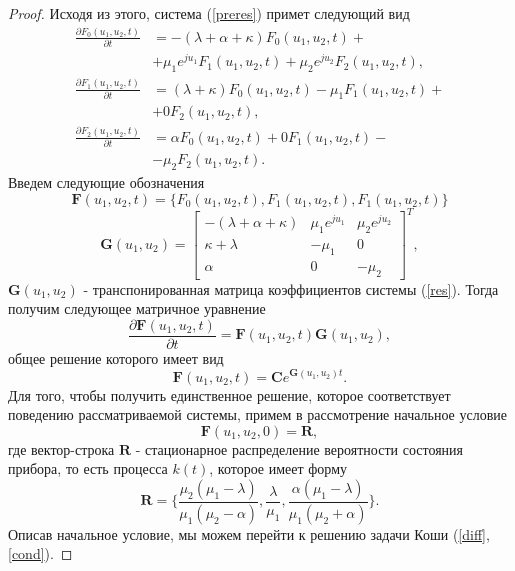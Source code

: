 \begin{proof}
Исходя из этого, система (\ref{preres}) примет следующий вид
\begin{equation} \label{res}
	\begin{split}
		\frac{{\partial F_{0}(u_{1},u_{2},t)}}{{\partial t}} &= -(\lambda + \alpha+ \kappa)F_{0}(u_{1},u_{2},t) + \\  &+ \mu_{1} e^{ju_{1}}F_{1}(u_{1},u_{2},t) + \mu_{2}e^{ju_{2}}F_{2}(u_{1},u_{2},t) ,
		\\
		\frac{{\partial F_{1}(u_{1},u_{2},t)}}{{\partial t}} &= (\lambda + \kappa)F_{0}(u_{1},u_{2},t) -  
		\mu_{1}F_{1}(u_{1},u_{2},t) +\\  &+  0F_{2}(u_{1},u_{2},t) ,
		\\
		\frac{{\partial F_{2}(u_{1},u_{2},t)}}{{\partial t}} &= \alpha F_{0}(u_{1},u_{2},t)   +  0F_{1}(u_{1},u_{2},t) -\\  &- \mu_{2}F_{2}(u_{1},u_{2},t).
	\end{split}
\end{equation}  
Введем следующие обозначения
\begin{equation*}
	\boldsymbol{F}(u_{1},u_{2},t) = \{F_{0}(u_{1},u_{2},t),F_{1}(u_{1},u_{2},t),F_{1}(u_{1},u_{2},t)\}
\end{equation*}  
\begin{equation*}
	\boldsymbol{G}(u_{1},u_{2})=\begin{bmatrix}
		-(\lambda + \alpha + \kappa) & \mu_{1}e^{ju_{1}} &  \mu_{2}e^{ju_{2}}\\
		\kappa+\lambda & -\mu_{1} & 0\\
		\alpha & 	0 &	-\mu_{2}
	\end{bmatrix}^{T},
\end{equation*}
$\boldsymbol{G}(u_{1},u_{2})$ - транспонированная матрица коэффициентов системы (\ref{res}).
Тогда получим следующее матричное уравнение
\begin{equation*}
	\frac{{\partial \boldsymbol{F}(u_{1},u_{2},t)}}{{\partial t}} =\boldsymbol{F}(u_{1},u_{2},t)\boldsymbol{G}(u_{1},u_{2}),
\end{equation*}
общее решение которого имеет вид
\begin{equation} \label{diff}
	\boldsymbol{F}(u_{1},u_{2},t)=\boldsymbol{C}e^{\boldsymbol{G}(u_{1},u_{2})t}.
\end{equation}
Для того, чтобы получить единственное решение, которое соответствует поведению рассматриваемой системы, примем в рассмотрение начальное условие
\begin{equation} \label{cond}
	\boldsymbol{F}(u_{1},u_{2},0)=\boldsymbol{R},
\end{equation}
где вектор-строка $\boldsymbol{R}$ - стационарное распределение вероятности состояния прибора, то есть процесса $k(t)$, которое имеет форму \cite{nazarov2017asymptotic}
\begin{equation*}
	\boldsymbol{R}=\{\frac{\mu_{2}(\mu_{1} - \lambda)}{\mu_{1}(\mu_{2} - \alpha)},\frac{\lambda}{\mu_{1}},\frac{\alpha(\mu_{1} - \lambda)}{\mu_{1}(\mu_{2} + \alpha)}\}.
\end{equation*}
Описав начальное условие, мы можем перейти к решению задачи Коши (\ref{diff}, \ref{cond}).


\end{proof}
